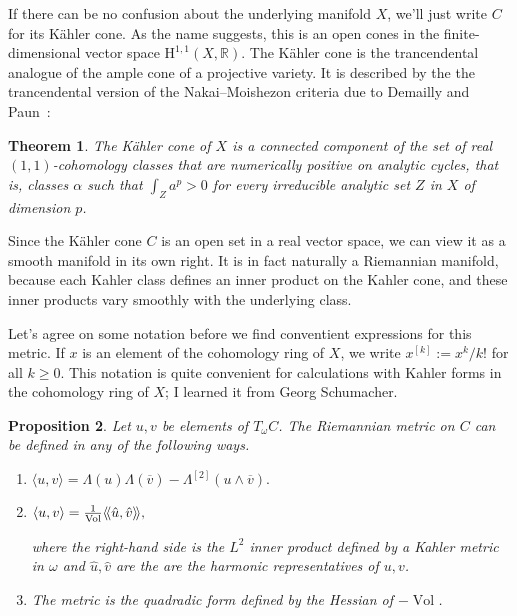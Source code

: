 \documentclass[11pt,a4paper]{amsart}
\newtheorem{theo}{Theorem}[section]
\newtheorem{prop}[theo]{Proposition}
\theoremstyle{definition}
\theoremstyle{remark}
\newcommand{\RR}{\mathbb{R}}
\newcommand{\Vol}{\mathop{\mathrm{Vol}}}
\def\ov#1{\overline{#1}}
\def\coho#1{\mathrm{H}^{#1}}
\def\kf{\omega}
\def\Lef{\Lambda}
\def\ton{u}
\def\ttw{v}
\def\^#1{^{[#1]}}
\def\KC{C}
\begin{document}
If there can be no confusion about the underlying manifold $X$, we'll
just write $\KC$ for its K\"{a}hler cone.  As the name suggests, this is
an open cones in the finite-dimensional vector space
$\coho{1,1}(X,\RR)$. The K\"{a}hler cone is the trancendental analogue
of the ample cone of a projective variety. It is described by the the
trancendental version of the Nakai--Moishezon criteria due to Demailly
and Paun~\cite{DemaillyPaun}:


\begin{theo}
The K\"{a}hler cone of $X$ is a connected component of the set of real
$(1,1)$-cohomology classes that are numerically positive on analytic
cycles, that is, classes $\alpha$ such that $\int_{Z} a^p > 0$ for every
irreducible analytic set $Z$ in $X$ of dimension $p$.
\end{theo}



Since the K\"{a}hler cone $\KC$ is an open set in a real vector space,
we can view it as a smooth manifold in its own right. It is in fact
naturally a Riemannian manifold, because each Kahler class defines an
inner product on the Kahler cone, and these inner products vary smoothly
with the underlying class.


Let's agree on some notation before we find conventient expressions for
this metric. If $x$ is an element of the cohomology ring of $X$, we
write $x\^k := x^k/k!$ for all $k \geq 0$. This notation is
quite convenient for calculations with Kahler forms in the cohomology
ring of $X$; I learned it from Georg Schumacher.


\begin{prop}
Let $\ton,\ttw$ be elements of $T_{\kf}C$. The Riemannian metric on $C$
can be defined in any of the following ways.
\begin{enumerate}
    \item
\hfil
$
\langle \ton, \ttw \rangle
= \Lef(\ton)\Lef(\ov\ttw)
- \Lef\^2(\ton\wedge\ov\ttw).
$
\hfil
    \item 
$
\hfil
\langle\ton, \ttw \rangle
= 
\frac{1}{\Vol} \langle\!\langle \hat\ton, \hat\ttw \rangle\!\rangle,
\hfil
$

\noindent
where the right-hand side is the $L^2$ inner product defined by a Kahler
metric in $\kf$ and $\hat\ton,\hat\ttw$ are the are the harmonic
representatives of $\ton, \ttw$.

    \item
The metric is the quadradic form defined by the Hessian of $-\Vol$.
\end{enumerate}
\end{prop}
\end{document}
